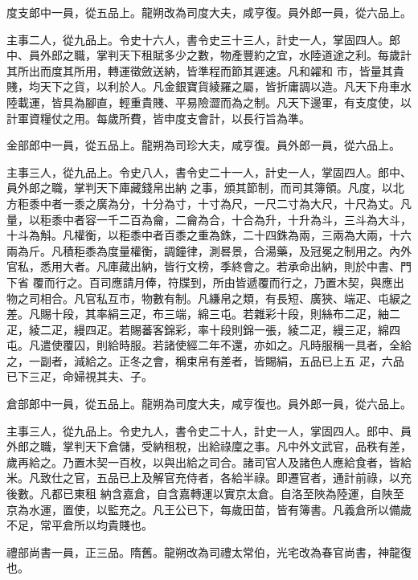 \begin{pinyinscope}
 度支郎中一員，從五品上。龍朔改為司度大夫，咸亨復。員外郎一員，從六品上。



 主事二人，從九品上。令史十六人，書令史三十三人，計史一人，掌固四人。郎中、員外郎之職，掌判天下租賦多少之數，物產豐約之宜，水陸道途之利。每歲計其所出而度其所用，轉運徵斂送納，皆準程而節其遲速。凡和糴和
 市，皆量其貴賤，均天下之貨，以利於人。凡金銀寶貨綾羅之屬，皆折庸調以造。凡天下舟車水陸載運，皆具為腳直，輕重貴賤、平易險澀而為之制。凡天下邊軍，有支度使，以計軍資糧仗之用。每歲所費，皆申度支會計，以長行旨為準。



 金部郎中一員，從五品上。龍朔為司珍大夫，咸亨復。員外郎一員，從六品上。



 主事三人，從九品上。令史八人，書令史二十一人，計史一人，掌固四人。郎中、員外郎之職，掌判天下庫藏錢帛出納
 之事，頒其節制，而司其簿領。凡度，以北方秬黍中者一黍之廣為分，十分為寸，十寸為尺，一尺二寸為大尺，十尺為丈。凡量，以秬黍中者容一千二百為龠，二龠為合，十合為升，十升為斗，三斗為大斗，十斗為斛。凡權衡，以秬黍中者百黍之重為銖，二十四銖為兩，三兩為大兩，十六兩為斤。凡積秬黍為度量權衡，調鐘律，測晷景，合湯藥，及冠冕之制用之。內外官私，悉用大者。凡庫藏出納，皆行文榜，季終會之。若承命出納，則於中書、門下省
 覆而行之。百司應請月俸，符牒到，所由皆遞覆而行之，乃置木契，與應出物之司相合。凡官私互市，物數有制。凡縑帛之類，有長短、廣狹、端疋、屯綟之差。凡賜十段，其率絹三疋，布三端，綿三屯。若雜彩十段，則絲布二疋，紬二疋，綾二疋，縵四疋。若賜蕃客錦彩，率十段則錦一張，綾二疋，縵三疋，綿四屯。凡遣使覆囚，則給時服。若諸使經二年不還，亦如之。凡時服稱一具者，全給之，一副者，減給之。正冬之會，稱束帛有差者，皆賜絹，五品已上五
 疋，六品已下三疋，命婦視其夫、子。



 倉部郎中一員，從五品上。龍朔為司度大夫，咸亨復也。員外郎一員，從六品上。



 主事三人，從九品上。令史九人，書令史二十人，計史一人，掌固四人。郎中、員外郎之職，掌判天下倉儲，受納租稅，出給祿廩之事。凡中外文武官，品秩有差，歲再給之。乃置木契一百枚，以與出給之司合。諸司官人及諸色人應給食者，皆給米。凡致仕之官，五品已上及解官充侍者，各給半祿。即遷官者，通計前祿，以充後數。凡都已東租
 納含嘉倉，自含嘉轉運以實京太倉。自洛至陜為陸運，自陜至京為水運，置使，以監充之。凡王公已下，每歲田苗，皆有簿書。凡義倉所以備歲不足，常平倉所以均貴賤也。



 禮部尚書一員，正三品。隋舊。龍朔改為司禮太常伯，光宅改為春官尚書，神龍復也。




\end{pinyinscope}
